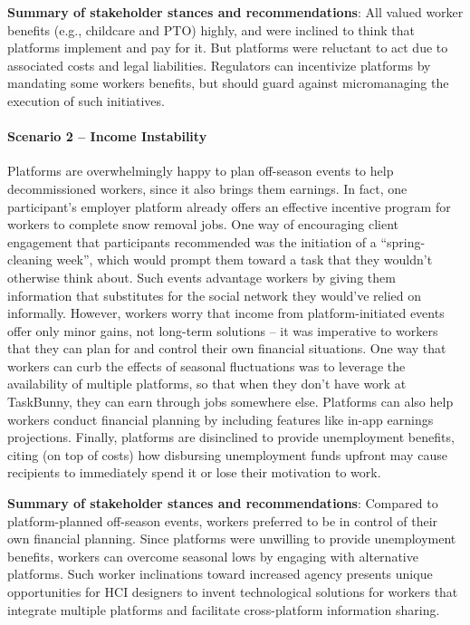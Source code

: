 \textbf{Summary of stakeholder stances and recommendations}: All valued worker benefits (e.g., childcare and PTO) highly, and were inclined to think that platforms implement and pay for it. But platforms were reluctant to act due to associated costs and legal liabilities. Regulators can incentivize platforms by mandating some workers benefits, but should guard against micromanaging the execution of such initiatives.


\FloatBarrier

\paragraph{Scenario 2 -- Income Instability} \label{s2}
Platforms are overwhelmingly happy to plan off-season events to help decommissioned workers, since it also brings them earnings. In fact, one participant's employer platform already offers an effective incentive program for workers to complete snow removal jobs. One way of encouraging client engagement that participants recommended was the initiation of a ``spring-cleaning week'', which would prompt them toward a task that they wouldn't otherwise think about. Such events advantage workers by giving them information that substitutes for the social network they would've relied on informally. However, workers worry that income from platform-initiated events offer only minor gains, not long-term solutions -- it was imperative to workers that they can plan for and control their own financial situations. One way that workers can curb the effects of seasonal fluctuations was to leverage the availability of multiple platforms, so that when they don't have work at TaskBunny, they can earn through jobs somewhere else. Platforms can also help workers conduct financial planning by including features like in-app earnings projections. Finally, platforms are disinclined to provide unemployment benefits, citing (on top of costs) how disbursing unemployment funds upfront may cause recipients to immediately spend it or lose their motivation to work.


\textbf{Summary of stakeholder stances and recommendations}: Compared to platform-planned off-season events, workers preferred to be in control of their own financial planning. Since platforms were unwilling to provide unemployment benefits, workers can overcome seasonal lows by engaging with alternative platforms. Such worker inclinations toward increased agency presents unique opportunities for HCI designers to invent technological solutions for workers that integrate multiple platforms and facilitate cross-platform information sharing.

